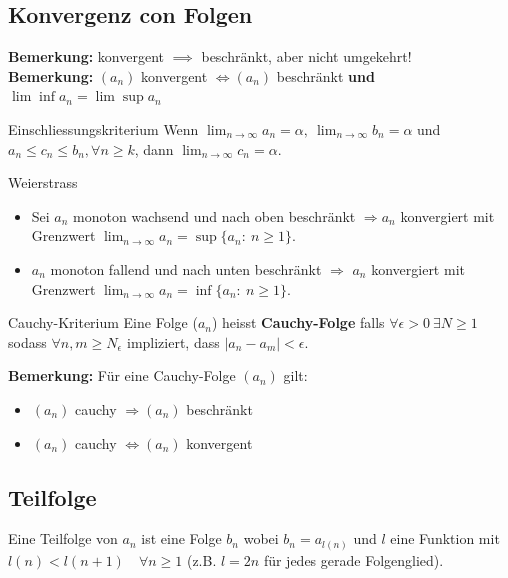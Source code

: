 \documentclass[a4paper,8pt]{extarticle}
\newenvironment{bemerkung}{
   \noindent \textbf{Bemerkung:  }}{}
\def\limn{\lim_{n\to \infty}}
\begin{document}
\subsection{Konvergenz con Folgen}

\begin{bemerkung}
konvergent $\implies$ beschränkt, aber nicht umgekehrt!
\end{bemerkung}\\
\begin{bemerkung}
$(a_n)$ konvergent $\iff (a_n)$ beschränkt \textbf{und} $\lim \inf a_n = \lim \sup a_n$
\end{bemerkung}

\begin{mainbox}{Einschliessungskriterium}
Wenn $\limn a_n = \alpha, \ \limn b_n = \alpha$ und $a_n \le c_n \le b_n, \forall n \ge k$, dann $\limn c_n = \alpha$.
\end{mainbox}

\begin{mainbox}{Weierstrass}
  \begin{itemize}

  \item Sei $a_n$ monoton wachsend und nach oben beschränkt $\Rightarrow a_n$ konvergiert mit Grenzwert $\limn a_n = \sup \{a_n : \ n \ge 1\}$.

  \item $a_n$ monoton fallend und nach unten beschränkt $\Rightarrow$ $a_n$ konvergiert mit Grenzwert $\limn a_n = \inf \{a_n : \ n \ge 1\}$.
  \end{itemize}
\end{mainbox}

\begin{mainbox}{Cauchy-Kriterium}
Eine Folge ($a_n$) heisst \textbf{Cauchy-Folge} falls $\forall \epsilon > 0 \ \exists N \ge 1$ sodass $\forall n,m \ge N_\epsilon$ impliziert, dass
$| a_n - a_m | < \epsilon$.
\end{mainbox}

\begin{bemerkung}
  Für eine Cauchy-Folge $(a_n)$ gilt:
  \begin{itemize}
    \item $(a_n)$ cauchy $\Rightarrow (a_n)$ beschränkt
    \item $(a_n)$ cauchy $\Leftrightarrow (a_n)$ konvergent
  \end{itemize}\leavevmode
\end{bemerkung}

\subsection{Teilfolge}
Eine Teilfolge von $a_n$ ist eine Folge $b_n$ wobei $b_n = a_{l(n)}$ und $l$ eine Funktion mit $l(n) < l(n+1) \quad \forall n \ge 1$ (z.B. $l = 2n$ für jedes gerade Folgenglied). 
\end{document}
